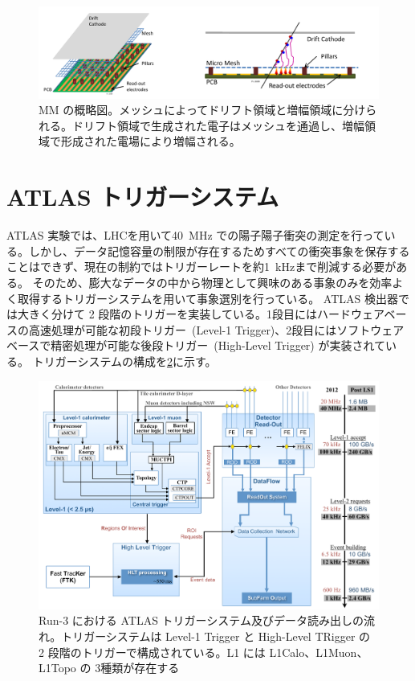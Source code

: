 \begin{figure}[tb]
  \centering
  \includegraphics[clip, width=13cm]{fig/2/mm-structure.pdf}
  \caption{MM の概略図。メッシュによってドリフト領域と増幅領域に分けられる。ドリフト領域で生成された電子はメッシュを通過し、増幅領域で形成された電場により増幅される。}
  \label{fig:MM}
\end{figure}



\section{ATLAS トリガーシステム}
ATLAS 実験では、LHCを用いて40~MHz での陽子陽子衝突の測定を行っている。しかし、データ記憶容量の制限が存在するためすべての衝突事象を保存することはできず、現在の制約ではトリガーレートを約1~kHzまで削減する必要がある。
そのため、膨大なデータの中から物理として興味のある事象のみを効率よく取得するトリガーシステムを用いて事象選別を行っている。
ATLAS 検出器では大きく分けて 2 段階のトリガーを実装している。1段目にはハードウェアベースの高速処理が可能な初段トリガー~(Level-1 Trigger)、2段目にはソフトウェアベースで精密処理が可能な後段トリガー~(High-Level Trigger) が実装されている。
トリガーシステムの構成を\ref{fig:トリガーの全体像}に示す。

\begin{figure}[tb]
  \centering
  \includegraphics[clip, width=14cm]{fig/3/trigger-nagare2.pdf}
  \caption{Run-3 における ATLAS トリガーシステム及びデータ読み出しの流れ。トリガーシステムは Level-1 Trigger と High-Level TRigger の 2 段階のトリガーで構成されている。L1 には L1Calo、L1Muon、L1Topo の 3種類が存在する}
  \label{fig:トリガーの全体像}
\end{figure}

